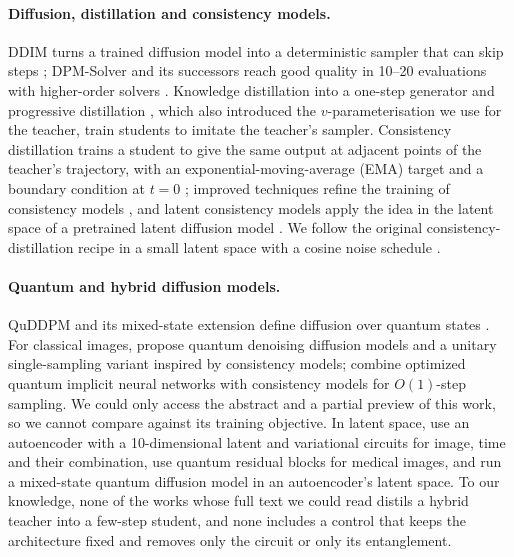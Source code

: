\documentclass[11pt]{article}
\begin{document}
\paragraph{Diffusion, distillation and consistency models.}
DDIM turns a trained diffusion model into a deterministic sampler that can skip
steps \citep{song2021ddim}; DPM-Solver and its successors reach good quality in
10--20 evaluations with higher-order solvers \citep{lu2022dpmsolver}. Knowledge
distillation into a one-step generator \citep{luhman2021knowledge} and
progressive distillation \citep{salimans2022progressive}, which also introduced
the $v$-parameterisation we use for the teacher, train students to imitate the
teacher's sampler. Consistency distillation trains a student to give the same
output at adjacent points of the teacher's trajectory, with an
exponential-moving-average (EMA) target and a boundary condition at $t=0$
\citep{song2023consistency}; improved techniques refine the training of
consistency models \citep{song2024improved}, and latent consistency models apply
the idea in the latent space of a pretrained latent diffusion model
\citep{luo2023lcm}. We follow the original consistency-distillation recipe in a
small latent space with a cosine noise schedule \citep{nichol2021improved}.

\paragraph{Quantum and hybrid diffusion models.}
QuDDPM and its mixed-state extension define diffusion over quantum states
\citep{zhang2023quddpm,kwun2024mixedquddpm}. For classical images,
\citet{kolle2024qddm} propose quantum denoising diffusion models and a unitary
single-sampling variant inspired by consistency models;
\citet{zhang2025oqiddm} combine optimized quantum implicit neural networks with
consistency models for $O(1)$-step sampling. We could only access the abstract
and a partial preview of this work, so we cannot compare against its training
objective. In latent space, \citet{defalco2025qldm} use an autoencoder with a
10-dimensional latent and variational circuits for image, time and their
combination, \citet{yeteraydeniz2025medical} use quantum residual blocks for
medical images, and \citet{qian2026hybrid} run a mixed-state quantum diffusion
model in an autoencoder's latent space. To our knowledge, none of the works whose
full text we could read distils a hybrid teacher into a few-step student, and
none includes a control that keeps the architecture fixed and removes only the
circuit or only its entanglement.
\end{document}
